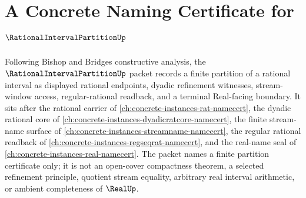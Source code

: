 \chapter{A Concrete Naming Certificate for $\RationalIntervalPartitionUp$}
\label{ch:concrete-instances-rational-interval-partition-namecert}

Following Bishop and Bridges constructive analysis, the $\RationalIntervalPartitionUp$ packet records a finite partition of a rational interval as displayed rational endpoints, dyadic refinement witnesses, stream-window access, regular-rational readback, and a terminal Real-facing boundary. It sits after the rational carrier of \autoref{ch:concrete-instances-rat-namecert}, the dyadic rational core of \autoref{ch:concrete-instances-dyadicratcore-namecert}, the finite stream-name surface of \autoref{ch:concrete-instances-streamname-namecert}, the regular rational readback of \autoref{ch:concrete-instances-regseqrat-namecert}, and the real-name seal of \autoref{ch:concrete-instances-real-namecert}. The packet names a finite partition certificate only; it is not an open-cover compactness theorem, a selected refinement principle, quotient stream equality, arbitrary real interval arithmetic, or ambient completeness of $\RealUp$.


